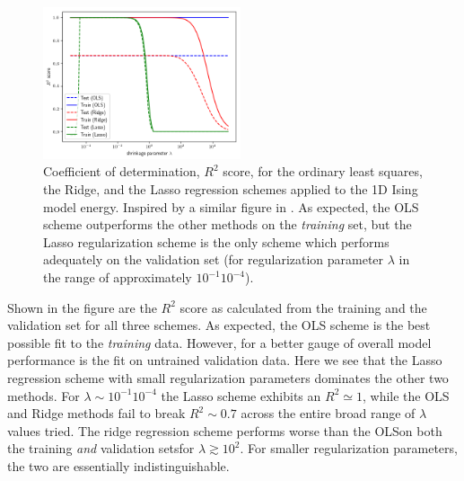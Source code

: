 \documentclass[a4paper, twocolumn]{article}
\begin{document}
\begin{figure}
  \centering
  \includegraphics[width=0.52\textwidth]{R2_ising_lambda.png}
  \caption{Coefficient of determination, $R^2$ score, for the ordinary least squares, the Ridge, and the Lasso regression schemes applied to the 1D Ising model energy. Inspired by a similar figure in \cite{mehta2018highbias}. As expected, the OLS scheme outperforms the other methods on the \textit{training} set, but the Lasso regularization scheme is the only scheme which performs adequately on the validation set (for regularization parameter $\lambda$ in the range of approximately $10^{-1}$\textemdash$10^{-4}$).  \label{fig:R2_lambda}}
\end{figure}

Shown in the figure are the $R^2$ score as calculated from the training and the validation set for all three schemes. As expected, the OLS scheme is the best possible fit to the \textit{training} data. However, for a better gauge of overall model performance is the fit on untrained validation data. Here we see that the Lasso regression scheme with small regularization parameters dominates the other two methods. For $\lambda\sim10^{-1}$\textemdash$10^{-4}$ the Lasso scheme exhibits an $R^2\simeq 1$, while the OLS and Ridge methods fail to break $R^2\sim0.7$ across the entire broad range of $\lambda$ values tried. The ridge regression scheme performs worse than the OLS\textemdash on both the training \textit{and} validation sets\textemdash for $\lambda\gtrsim 10^2$. For smaller regularization parameters, the two are essentially indistinguishable. 
\end{document}
